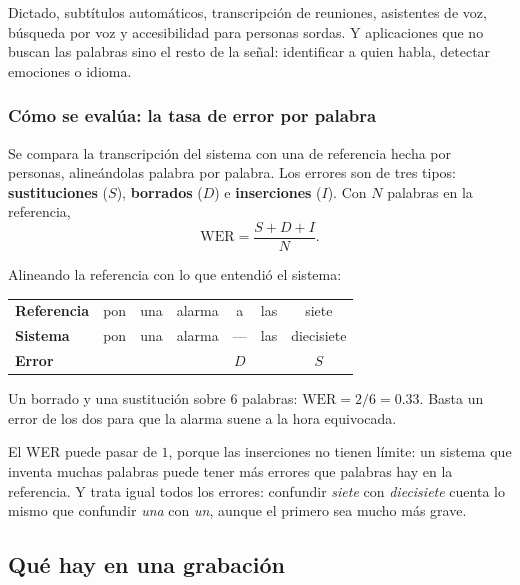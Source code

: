 \documentclass[11pt,letterpaper]{article}
\begin{document}
Dictado, subtítulos automáticos, transcripción de reuniones,
asistentes de voz, búsqueda por voz y accesibilidad para personas
sordas. Y aplicaciones que no buscan las palabras sino el resto de la
señal: identificar a quien habla, detectar emociones o idioma.

\subsubsection*{Cómo se evalúa: la tasa de error por palabra}

Se compara la transcripción del sistema con una de referencia hecha
por personas, alineándolas palabra por palabra. Los errores son de
tres tipos: \textbf{sustituciones} ($S$), \textbf{borrados} ($D$) e
\textbf{inserciones} ($I$). Con $N$ palabras en la referencia,
\[
    \text{WER} = \frac{S + D + I}{N} .
\]

\begin{ejemplo}
    Alineando la referencia con lo que entendió el sistema:
    \begin{center}
    \begin{tabular}{lcccccc}
        \toprule
        \textbf{Referencia} & pon & una & alarma & a & las & siete \\
        \textbf{Sistema}    & pon & una & alarma & --- & las
                            & diecisiete \\
        \textbf{Error}      & & & & $D$ & & $S$ \\
        \bottomrule
    \end{tabular}
    \end{center}
    Un borrado y una sustitución sobre $6$ palabras:
    $\text{WER} = 2/6 = 0.33$. Basta un error de los dos para que la
    alarma suene a la hora equivocada.
\end{ejemplo}

\begin{ojo}
    El WER puede pasar de $1$, porque las inserciones no tienen límite:
    un sistema que inventa muchas palabras puede tener más errores que
    palabras hay en la referencia. Y trata igual todos los errores:
    confundir \textit{siete} con \textit{diecisiete} cuenta lo mismo
    que confundir \textit{una} con \textit{un}, aunque el primero sea
    mucho más grave.
\end{ojo}


\subsection*{Qué hay en una grabación}
\end{document}
